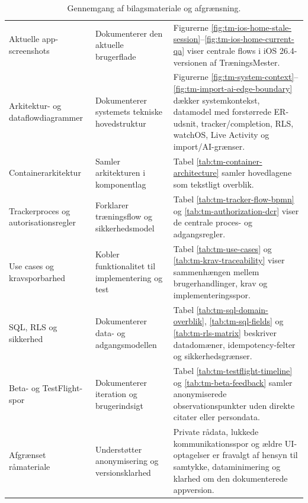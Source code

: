\begin{table}[htbp]
\small
\renewcommand{\arraystretch}{1.18}
\begin{tabularx}{\textwidth}{>{\RaggedRight\arraybackslash}p{} >{\RaggedRight\arraybackslash}p{} Y}
\toprule
{} &  &  \\
\midrule
Aktuelle app-screenshots & Dokumenterer den aktuelle brugerflade & Figurerne \ref{fig:tm-ios-home-stale-session}--\ref{fig:tm-ios-home-current-qa} viser centrale flows i iOS 26.4-versionen af TræningsMester. \\
Arkitektur- og dataflowdiagrammer & Dokumenterer systemets tekniske hovedstruktur & Figurerne \ref{fig:tm-system-context}--\ref{fig:tm-import-ai-edge-boundary} dækker systemkontekst, datamodel med forstørrede ER-udsnit, tracker/completion, RLS, watchOS, Live Activity og import/AI-grænser. \\
Containerarkitektur & Samler arkitekturen i komponentlag & Tabel \ref{tab:tm-container-architecture} samler hovedlagene som tekstligt overblik. \\
Trackerproces og autorisationsregler & Forklarer træningsflow og sikkerhedsmodel & Tabel \ref{tab:tm-tracker-flow-bpmn} og \ref{tab:tm-authorization-dcr} viser de centrale proces- og adgangsregler. \\
Use cases og kravsporbarhed & Kobler funktionalitet til implementering og test & Tabel \ref{tab:tm-use-cases} og \ref{tab:tm-krav-traceability} viser sammenhængen mellem brugerhandlinger, krav og implementeringsspor. \\
SQL, RLS og sikkerhed & Dokumenterer data- og adgangsmodellen & Tabel \ref{tab:tm-sql-domain-overblik}, \ref{tab:tm-sql-fields} og \ref{tab:tm-rls-matrix} beskriver datadomæner, idempotency-felter og sikkerhedsgrænser. \\
Beta- og TestFlight-spor & Dokumenterer iteration og brugerindsigt & Tabel \ref{tab:tm-testflight-timeline} og \ref{tab:tm-beta-feedback} samler anonymiserede observationspunkter uden direkte citater eller persondata. \\
Afgrænset råmateriale & Understøtter anonymisering og versionsklarhed & Private rådata, lukkede kommunikationsspor og ældre UI-optagelser er fravalgt af hensyn til samtykke, dataminimering og klarhed om den dokumenterede appversion. \\
\bottomrule
\end{tabularx}
\caption{Gennemgang af bilagsmateriale og afgrænsning.}
\label{tab:tm-bilag-materialegennemgang}
\end{table}

